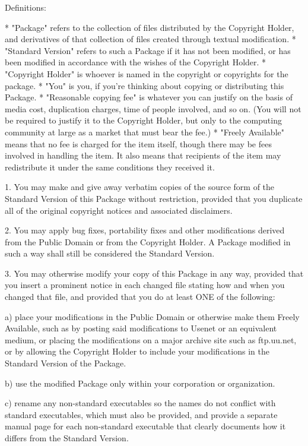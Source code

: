 \documentclass{doc}
\begin{document}
Definitions:

*	"Package" refers to the collection of files distributed by the Copyright Holder, and
derivatives of that collection of files created through textual modification.
*	"Standard Version" refers to such a Package if it has not been modified, or has been
modified in accordance with the wishes of the Copyright Holder.
*	"Copyright Holder" is whoever is named in the copyright or copyrights for the
package.
*	"You" is you, if you're thinking about copying or distributing this Package.
*	"Reasonable copying fee" is whatever you can justify on the basis of media cost,
duplication charges, time of people involved, and so on. (You will not be required to
justify it to the Copyright Holder, but only to the computing community at large as a
market that must bear the fee.)
*	"Freely Available" means that no fee is charged for the item itself, though there may
be fees involved in handling the item. It also means that recipients of the item may
redistribute it under the same conditions they received it.


1. You may make and give away verbatim copies of the source form of the Standard Version
of this Package without restriction, provided that you duplicate all of the original
copyright notices and associated disclaimers.

2. You may apply bug fixes, portability fixes and other modifications derived from the
Public Domain or from the Copyright Holder. A Package modified in such a way shall still
be considered the Standard Version.

3. You may otherwise modify your copy of this Package in any way, provided that you insert
a prominent notice in each changed file stating how and when you changed that file, and
provided that you do at least ONE of the following:


a) place your modifications in the Public Domain or otherwise make them Freely Available,
such as by posting said modifications to Usenet or an equivalent medium, or placing the
modifications on a major archive site such as ftp.uu.net, or by allowing the Copyright
Holder to include your modifications in the Standard Version of the Package.

b) use the modified Package only within your corporation or organization.

c) rename any non-standard executables so the names do not conflict with standard
executables, which must also be provided, and provide a separate manual page for each
non-standard executable that clearly documents how it differs from the Standard Version.
\end{document}
